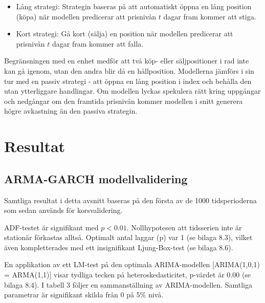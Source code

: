 \documentclass[11pt]{article}
\begin{document}
\begin{itemize}
    \item Lång strategi: Strategin baseras på att automatiskt öppna en lång position (köpa) när modellen predicerar att prisnivån $t$ dagar fram kommer att stiga.
    \item Kort strategi: Gå kort (sälja) en position när modellen predicerar att prisnivån $t$ dagar fram kommer att falla. 
\end{itemize}

Begränsningen med en enhet medför att två köp- eller säljpositioner i rad inte kan gå igenom, utan den andra  blir då en hållposition. Modellerna jämförs i sin tur med en passiv strategi - att öppna en lång position i index och behålla den utan ytterliggare handlingar. Om modellen lyckas spekulera rätt kring uppgångar och nedgångar om den framtida prisnivån kommer modellen i snitt generera högre avkastning än den passiva strategin. 


\section{Resultat}
\subsection{ARMA-GARCH modellvalidering}
Samtliga resultat i detta avsnitt baseras på den första av de 1000 tidsperioderna som sedan används för korsvalidering. \par

ADF-testet är signifikant med \(p<0.01\). Nollhypotesen att tidsserien inte är stationär förkastas alltså. Optimalt antal laggar (p) var 1 (se bilaga 8.3), vilket även kompletterades med ett insignifikant Ljung-Box-test (se bilaga 8.6). \par

En applikation av ett LM-test på den optimala ARIMA-modellen [ARIMA(1,0,1) = ARMA(1,1)] visar tydliga tecken på heteroskedasticitet, p-värdet är 0.00 (se bilaga 8.4). I tabell 3 följer en sammanställning av ARIMA-modellen. Samtliga parametrar är signifikant skilda från 0 på 5\% nivå. \par
\end{document}
